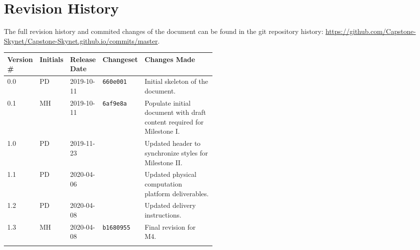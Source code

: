 \section*{Revision History}
The full revision history and commited changes of the document can be found in the git repository history: \href{https://github.com/Capstone-Skynet/Capstone-Skynet.github.io}{https://github.com/Capstone-Skynet/Capstone-Skynet.github.io/commits/master}.

\begin{table}[H]
\begin{tabular}{*{4}{l}p{0.5\linewidth}}
\hline
Version \# & Initials & Release Date & Changeset & Changes Made \\ \hline

0.0 & PD & 2019-10-11 & \texttt{660e001} & Initial skeleton of the document.\\
0.1 & MH & 2019-10-11 & \texttt{6af9e8a} & Populate initial document with draft content required for Milestone I.\\
1.0 & PD & 2019-11-23 & \texttt{} & Updated header to synchronize styles for Milestone II.\\
1.1 & PD & 2020-04-06 & \texttt{} & Updated physical computation platform deliverables.\\
1.2 & PD & 2020-04-08 & \texttt{} & Updated delivery instructions.\\
1.3 & MH & 2020-04-08 & \texttt{b1680955} & Final revision for M4.\\
 & & & \\ \hline
\end{tabular}
\end{table}
